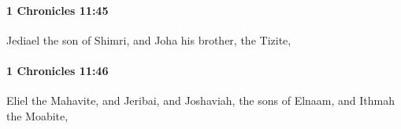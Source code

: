 		\paragraph{1 Chronicles 11:45} %
			\label{1CHRONICLES-11-45}

			Jediael the son of Shimri, and Joha his brother, the Tizite,


		\paragraph{1 Chronicles 11:46} %
			\label{1CHRONICLES-11-46}

			Eliel the Mahavite, and Jeribai, and Joshaviah, the sons of Elnaam, and Ithmah the Moabite,


